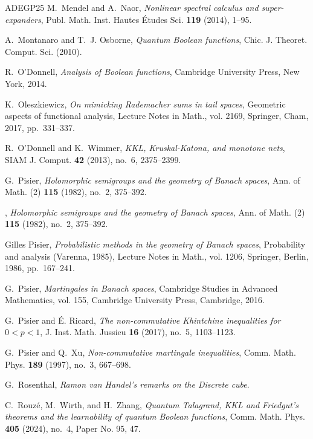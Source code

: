 \documentclass{amsbook}
\theoremstyle{definition}
\theoremstyle{remark}
\numberwithin{section}{chapter}
\numberwithin{equation}{chapter}
\newcommand{\1}{\mathbf{1}}
\begin{document}
\begin{thebibliography}{ADEGP25}
	M.~Mendel and A.~Naor, \emph{Nonlinear spectral calculus and super-expanders},
	Publ. Math. Inst. Hautes \'{E}tudes Sci. \textbf{119} (2014), 1--95.
	
	A.~Montanaro and T.~J. Osborne, \emph{Quantum {B}oolean functions}, Chic. J.
	Theoret. Comput. Sci. (2010).
	
	R.~O'Donnell, \emph{Analysis of {B}oolean functions}, Cambridge University
	Press, New York, 2014.
	
	K.~Oleszkiewicz, \emph{On mimicking {R}ademacher sums in tail spaces},
	Geometric aspects of functional analysis, Lecture Notes in Math., vol. 2169,
	Springer, Cham, 2017, pp.~331--337. 
	
	R.~O'Donnell and K.~Wimmer, \emph{K{KL}, {K}ruskal-{K}atona, and monotone
		nets}, SIAM J. Comput. \textbf{42} (2013), no.~6, 2375--2399.
	
	G.~Pisier, \emph{Holomorphic semigroups and the geometry of {B}anach spaces},
	Ann. of Math. (2) \textbf{115} (1982), no.~2, 375--392. 
	
	\bysame, \emph{Holomorphic semigroups and the geometry of {B}anach spaces},
	Ann. of Math. (2) \textbf{115} (1982), no.~2, 375--392.
	
	Gilles Pisier, \emph{Probabilistic methods in the geometry of {B}anach spaces},
	Probability and analysis ({V}arenna, 1985), Lecture Notes in Math., vol.
	1206, Springer, Berlin, 1986, pp.~167--241. 
	
	G.~Pisier, \emph{Martingales in {B}anach spaces}, Cambridge Studies in Advanced
	Mathematics, vol. 155, Cambridge University Press, Cambridge, 2016.
	
	G.~Pisier and \'{E}. Ricard, \emph{The non-commutative {K}hintchine
		inequalities for {$0<p<1$}}, J. Inst. Math. Jussieu \textbf{16} (2017),
	no.~5, 1103--1123. 
	
	G.~Pisier and Q.~Xu, \emph{Non-commutative martingale inequalities}, Comm.
	Math. Phys. \textbf{189} (1997), no.~3, 667--698.
	
	G.~Rosenthal, \emph{Ramon van {H}andel's remarks on the {D}iscrete cube}.
	
	C.~Rouz\'{e}, M.~Wirth, and H.~Zhang, \emph{Quantum {T}alagrand, {KKL} and
		{F}riedgut's theorems and the learnability of quantum {B}oolean functions},
	Comm. Math. Phys. \textbf{405} (2024), no.~4, Paper No. 95, 47. 
	

\end{thebibliography}
\end{document}
